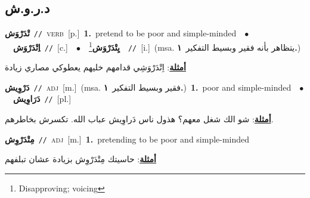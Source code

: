 \documentclass[10pt,a4paper,twoside]{article} %
\begin{document}
\begin{multicols}{2}
\vspace{-3mm}
\subsection*{\color{blue}\foreignlanguage{arabic}{د.ر.و.ش}\color{blue}{}} 

{\setlength\topsep{0pt}\textbf{\foreignlanguage{arabic}{تْدَرْوَش}}\ {\color{gray}\texttt{//}\color{black}}\ \textsc{verb}\ [p.]\ \textbf{1.}~pretend to be poor and simple-minded\ \ $\bullet$\ \ \setlength\topsep{0pt}\textbf{\foreignlanguage{arabic}{اِتْدَرْوَش}}\ {\color{gray}\texttt{//}\color{black}}\ [c.]\ \ $\bullet$\ \ \setlength\topsep{0pt}\textbf{\foreignlanguage{arabic}{يِتْدَرْوَش}}\footnote{Disapproving; voicing}\ \ {\color{gray}\texttt{//}\color{black}}\ [i.]\ \color{gray}(msa. \foreignlanguage{arabic}{يتظاهر بأنه فقير وبسيط التفكير}~\foreignlanguage{arabic}{\textbf{١.}})\color{black}\  \begin{flushright}\color{gray}\foreignlanguage{arabic}{\textbf{\underline{\foreignlanguage{arabic}{أمثلة}}}: اِتْدَرْوَشِي قدامهم خليهم يعطوكي مصاري زيادة}\end{flushright}\color{black}} \vspace{2mm}

{\setlength\topsep{0pt}\textbf{\foreignlanguage{arabic}{دَرْوِيش}}\ {\color{gray}\texttt{//}\color{black}}\ \textsc{adj}\ [m.]\ \color{gray}(msa. \foreignlanguage{arabic}{فقير وبسيط التفكير}~\foreignlanguage{arabic}{\textbf{١.}})\color{black}\ \textbf{1.}~poor and simple-minded\ \ $\bullet$\ \ \setlength\topsep{0pt}\textbf{\foreignlanguage{arabic}{دَرَاوِيش}}\ {\color{gray}\texttt{//}\color{black}}\ [pl.]\  \begin{flushright}\color{gray}\foreignlanguage{arabic}{\textbf{\underline{\foreignlanguage{arabic}{أمثلة}}}: شو الك شغل معهم؟ هذول ناس دَراوِيش عباب الله. تكسرش بخاطرهم.}\end{flushright}\color{black}} \vspace{2mm}

{\setlength\topsep{0pt}\textbf{\foreignlanguage{arabic}{مِتْدَرْوِش}}\ {\color{gray}\texttt{//}\color{black}}\ \textsc{adj}\ [m.]\ \textbf{1.}~pretending to be poor and simple-minded\  \begin{flushright}\color{gray}\foreignlanguage{arabic}{\textbf{\underline{\foreignlanguage{arabic}{أمثلة}}}: حاسيتك مِتْدَرْوِش بزيادة عشان تبلفهم}\end{flushright}\color{black}} \vspace{2mm}


\end{multicols}
\end{document}
